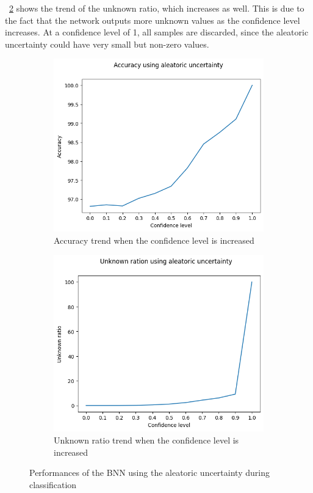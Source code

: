 \Fig~\ref{fig:aleatoric_unk} shows the trend of the unknown ratio, which increases as well. This is due to the fact that the network outputs more unknown values as the confidence level increases. At a confidence level of 1, all samples are discarded, since the aleatoric uncertainty could have very small but non-zero values.

\begin{figure}[h]
	\centering
	\begin{subfigure}{.5\textwidth}
		\centering
		\includegraphics[width=0.8\linewidth]{ImageFiles/ClassifUncer/aleatoric_acc}
		\caption{Accuracy trend when the confidence level is increased}
		\label{fig:aleatoric_acc}
	\end{subfigure}%
	\begin{subfigure}{.5\textwidth}
		\centering
		\includegraphics[width=0.8\linewidth]{ImageFiles/ClassifUncer/aleatoric_unk}
		\caption{Unknown ratio trend when the confidence level is increased}
		\label{fig:aleatoric_unk}
	\end{subfigure}
	\caption{Performances of the BNN using the aleatoric uncertainty during classification}
	\label{fig:aleatoric_class}
\end{figure}

